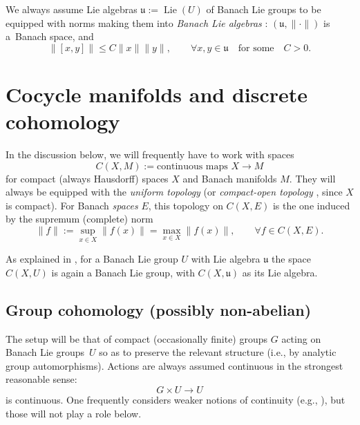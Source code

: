 \documentclass[11pt]{article}
\numberwithin{equation}{section}
\numberwithin{equation}{section}
\newcommand\fu{{\mathfrak u}}
\begin{document}
We always assume Lie algebras $\fu:=\operatorname{Lie}(U)$ of Banach Lie groups to be equipped with norms making them into {\it Banach Lie algebras} \cite[discussion following Definition IV.1]{neeb-inf}: $(\fu,\|\cdot\|)$ is a~Banach space, and
\begin{equation*}
 \|[x,y]\|\le C\|x\| \|y\|,\qquad \forall x,y\in \fu \quad\text{for some}\quad C>0.
\end{equation*}

\section{Cocycle manifolds and discrete cohomology}\label{subse:cocyman}

In the discussion below, we will frequently have to work with spaces
\begin{equation*}
 C(X,M)
 :=
 \text{continuous maps }X\to M
\end{equation*}
for compact (always Hausdorff) spaces $X$ and Banach manifolds $M$. They will always be equipped with the {\it uniform topology} (or {\it compact-open topology} \cite[Definition preceding Theorem 46.8]{munk}, since $X$ is compact). For Banach {\it spaces} $E$, this topology on $C(X,E)$ is the one induced by the supremum (complete) norm
\begin{equation*}
 \|f\|:=\sup_{x\in X}\|f(x)\| = \max_{x\in X}\|f(x)\|,\qquad \forall f\in C(X,E).
\end{equation*}

As explained in \cite[Section~3.2]{ps-loop}, for a Banach Lie group $U$ with Lie algebra $\fu$ the space $C(X,U)$ is again a Banach Lie group, with $C(X,\fu)$ as its Lie algebra.

\subsection{Group cohomology (possibly non-abelian)}\label{subse:coh}

The setup will be that of compact (occasionally finite) groups $G$ acting on Banach Lie groups~$U$ so as to preserve the relevant structure (i.e., by analytic group automorphisms). Actions are always assumed continuous in the strongest reasonable sense:
\begin{equation*}
 G\times U\to U
\end{equation*}
is continuous. One frequently considers weaker notions of continuity (e.g., \cite[Section~X.1]{tak2}), but those will not play a role below.
\end{document}

